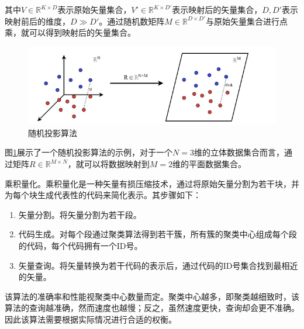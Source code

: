 其中$V\in\mathbb{R}^{K\times D}$表示原始矢量集合，$V'\in\mathbb{R}^{K\times D'}$表示映射后的矢量集合，$D,D'$表示映射前后的维度，$D\gg D'$。通过随机数矩阵$M\in\mathbb{R}^{D\times D'}$与原始矢量集合进行点乘，就可以得到映射后的矢量集合。

\begin{figure}[H]
    \includegraphics[width=\textwidth]{examples/random projection.png}
    \centering
    \caption{随机投影算法}
    \label{fig:rand_proj}
\end{figure}

图\ref{fig:rand_proj}展示了一个随机投影算法的示例，对于一个$N=3$维的立体数据集合而言，通过矩阵$R\in\mathbb{R}^{M\times N}$，就可以将数据映射到$M=2$维的平面数据集合。

乘积量化\cite{jegou2010product}。乘积量化是一种矢量有损压缩技术，通过将原始矢量分割为若干块，并为每个块生成代表性的代码来简化表示。其步骤如下：

\begin{enumerate}
    \item 矢量分割。将矢量分割为若干段。
    \item 代码生成。对每个段通过聚类算法得到若干簇，所有簇的聚类中心组成每个段的代码，每个代码拥有一个ID号。
    \item 矢量查询。将矢量转换为若干代码的表示后，通过代码的ID号集合找到最相近的矢量。
\end{enumerate}

该算法的准确率和性能视聚类中心数量而定。聚类中心越多，即聚类越细致时，该算法的查询越准确，然而速度也越慢；反之，虽然速度更快，查询却会更不准确。因此该算法需要根据实际情况进行合适的权衡。

